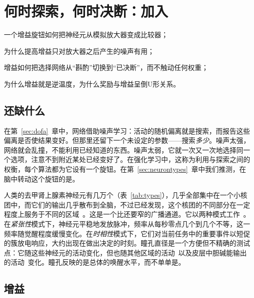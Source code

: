 \chapter{何时探索，何时决断：加入}
\label{sec:nora}
\begin{chaptergoals}
\item 一个增益旋钮如何把神经元从模拟放大器变成比较器；
\item 为什么提高增益只对放大器之后产生的噪声有用；
\item 增益如何把选择网络从“斟酌”切换到“已决断”，而不触动任何权重；
\item 为什么增益就是逆温度，为什么奖励与增益呈倒U形关系。
\end{chaptergoals}

\section{还缺什么}

在第~\ref{sec:dofa}~章中，网络借助噪声学习：活动的随机偏离就是搜索，而报告这些偏离是否使结果变好。但那里还留下一个未设定的参数——搜索\emph{多少}。噪声太强，网络就会乱撞，不能利用已经知道的东西。噪声太弱，它就一次又一次地选择同一个选项，注意不到附近某处已经变好了。在强化学习中，这称为利用与探索之间的权衡，每个算法都为它设有一个旋钮。在第~\ref{sec:neurontypes}~章中我们推测，在脑中转动这个旋钮的是。

人类的去甲肾上腺素神经元有几万个（表~\ref{tab:types}），几乎全部集中在一个小核团中，而它们的输出几乎散布到全脑，不过已经发现，这个核团的不同部分在一定程度上服务于不同的区域~\cite{Poe2020}。这是一个比还要窄的广播通道。它以两种模式工作~\cite{AstonJones2005}。在\emph{紧张性}模式下，神经元平稳地发放脉冲，频率从每秒零点几个到几个不等，这一频率随觉醒程度缓慢变化。在\emph{时相性}模式下，它们对当前任务中的重要事件以短促的簇放电响应，大约出现在做出决定的时刻。瞳孔直径是一个方便但不精确的测试点：它随这些神经元的活动变化，但也随其他区域的活动~\cite{Joshi2016}以及皮层中胆碱能输出的活动~\cite{Reimer2016}变化。瞳孔反映的是总体的唤醒水平，而不单单是。

\section{增益}

